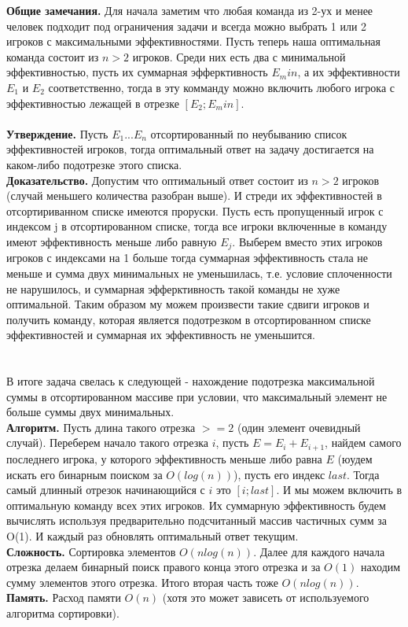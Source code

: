 \documentclass{article}
\begin{document}
\textbf{Общие замечания.}
Для начала заметим что любая команда из 2-ух и менее человек подходит под ограничения задачи и всегда можно выбрать 1 или 2 игроков с максимальными эффективностями.
Пусть теперь наша оптимальная команда состоит из $n > 2$ игроков. Среди них есть два с минимальной эффективностью,
пусть их суммарная эфферктивность $E_min$, а их эффективности $E_1$ и $E_2$ соответственно, тогда в эту комманду можно
включить любого игрока с эффективностью лежащей в отрезке $[E_2;E_min]$.
\\
\\
\textbf{Утверждение.}
Пусть $E_1...E_n$ отсортированный по неубыванию список эффективностей игроков, тогда оптимальный ответ на задачу достигается на каком-либо
подотрезке этого списка.
\\
\textbf{Доказательство.}
Допустим что оптимальный ответ состоит из $n > 2$ игроков (случай меньшего количества разобран выше). И стреди их эффективностей в отсортириванном списке имеются проруски. Пусть есть пропущенный игрок с индексом j в отсортированном списке, тогда все игроки включенные в команду имеют эффективность меньше либо равную $E_j$. Выберем вместо этих игроков игроков с индексами на 1 больше тогда суммарная эффективность стала не меньше и сумма двух минимальных не уменьшилась, т.е. условие сплоченности не нарушилось, и суммарная эфферктивность такой команды не хуже оптимальной. Таким образом му можем произвести такие сдвиги игроков и получить команду, которая является подотрезком в отсортированном списке эффективностей и суммарная их эффективность не уменьшится.
\\
\\
\\
В итоге задача свелась к следующей - нахождение подотрезка максимальной суммы в отсортированном массиве при условии, что максимальный элемент не больше суммы двух минимальных.
\\
\textbf{Алгоритм.}
Пусть длина такого отрезка $>=2$ (один элемент очевидный случай). Переберем начало такого отрезка $i$, пусть $E = E_i + E_{i + 1}$, найдем самого последнего игрока, у которого эффективность меньше либо равна $E$ (юудем искать его бинарным поиском за $O(log(n))$), пусть его индекс $last$. Тогда самый длинный отрезок начинающийся с $i$ это $[i;last]$. И мы можем включить в оптимальную команду всех этих игроков. Их суммарную эффективность будем вычислять используя предварительно подсчитанный массив частичных сумм за O(1). И каждый раз обновлять оптимальный ответ текущим.
\\
\textbf{Сложность.}
Сортировка элементов $O(nlog(n))$. Далее для каждого начала отрезка делаем бинарный поиск правого конца этого отрезка и за $O(1)$ находим сумму элементов этого отрезка. Итого вторая часть тоже $O(nlog(n))$.
\\
\textbf{Память.}
Расход памяти $O(n)$ (хотя это может зависеть от используемого алгоритма сортировки).
\end{document}
